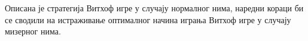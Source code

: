 \documentclass[a4paper]{article}
\begin{document}
Описана је стратегија Витхоф игре у случају нормалног нима, наредни кораци би се сводили на истраживање оптималног начина играња Витхоф игре у случају мизерног нима.
%
\newpage
{}
\appendix
 

\end{document}

